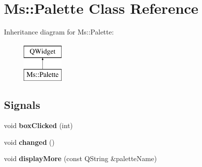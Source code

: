 \hypertarget{class_ms_1_1_palette}{}\section{Ms\+:\+:Palette Class Reference}
\label{class_ms_1_1_palette}
Inheritance diagram for Ms\+:\+:Palette\+:\begin{figure}[H]
\begin{center}
\leavevmode
\includegraphics[height=2.000000cm]{class_ms_1_1_palette}
\end{center}
\end{figure}
\subsection*{Signals}
\begin{DoxyCompactItemize}
\item 
\mbox{\label{class_ms_1_1_palette_aa7cc9b4bac7fcf6b6441807aecd64f9e}} 
void {\bfseries box\+Clicked} (int)
\item 
\mbox{\label{class_ms_1_1_palette_a46d0ba9cda623484868ee8c2edee5963}} 
void {\bfseries changed} ()
\item 
\mbox{\label{class_ms_1_1_palette_a7472adeee796c2a02bacbc1fbf31c49d}} 
void {\bfseries display\+More} (const Q\+String \&palette\+Name)
\end{DoxyCompactItemize}
